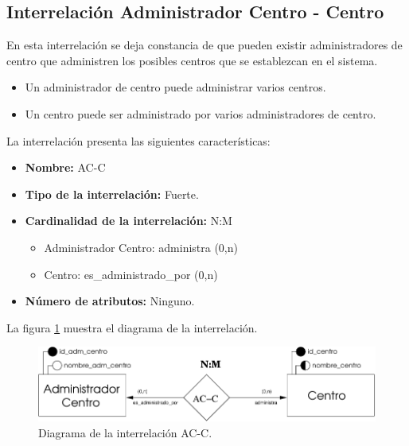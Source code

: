 \subsection{Interrelación Administrador Centro - Centro}

   \begin{description}
      \item[Definición] En esta interrelación se deja constancia de que pueden
      existir administradores de centro que administren los posibles centros
      que se establezcan en el sistema.

      \begin{itemize}
       \item Un administrador de centro puede administrar varios centros.
       \item Un centro puede ser administrado por varios administradores de
             centro.
      \end{itemize}

      \item[Características] La interrelación presenta las siguientes
                             características:

         \begin{itemize}
            \item \textbf{Nombre:} AC-C
            \item \textbf{Tipo de la interrelación:} Fuerte.
            \item \textbf{Cardinalidad de la interrelación:} N:M
                  \begin{itemize}
                     \item Administrador Centro: administra (0,n)
                     \item Centro: es\_administrado\_por (0,n)
                  \end{itemize}
            \item \textbf{Número de atributos:} Ninguno.
         \end{itemize}

      \item[Diagrama] La figura \ref{diagramaAC-C} muestra el diagrama de la
                      interrelación.
      \item \begin{figure}[!ht]
            \begin{center}
            \includegraphics[]{07.Modelo_Entidad-Interrelacion/7.3.Analisis_Interrelaciones/diagramas/AC-C.pdf}
            \caption{Diagrama de la interrelación AC-C.}
            \label{diagramaAC-C}
            \end{center}
         \end{figure}


\end{description}
